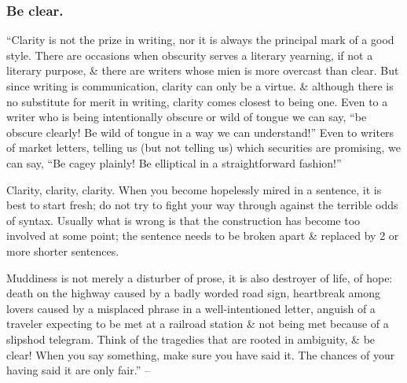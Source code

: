 \documentclass{article}
\begin{document}

\subsubsection{Be clear.}
``Clarity is not the prize in writing, nor it is always the principal mark of a good style. There are occasions when obscurity serves a literary yearning, if not a literary purpose, \& there are writers whose mien is more overcast than clear. But since writing is communication, clarity can only be a virtue. \& although there is no substitute for merit in writing, clarity comes closest to being one. Even to a writer who is being intentionally obscure or wild of tongue we can say, ``be obscure clearly! Be wild of tongue in a way we can understand!'' Even to writers of market letters, telling us (but not telling us) which securities are promising, we can say, ``Be cagey plainly! Be elliptical in a straightforward fashion!''

Clarity, clarity, clarity. When you become hopelessly mired in a sentence, it is best to start fresh; do not try to fight your way through against the terrible odds of syntax. Usually what is wrong is that the construction has become too involved at some point; the sentence needs to be broken apart \& replaced by 2 or more shorter sentences.

Muddiness is not merely a disturber of prose, it is also destroyer of life, of hope: death on the highway caused by a badly worded road sign, heartbreak among lovers caused by a misplaced phrase in a well-intentioned letter, anguish of a traveler expecting to be met at a railroad station \& not being met because of a slipshod telegram. Think of the tragedies that are rooted in ambiguity, \& be clear! When you say something, make sure you have said it. The chances of your having said it are only fair.'' -- \cite[p. 95]{Strunk_White_element_style}

\end{document}
